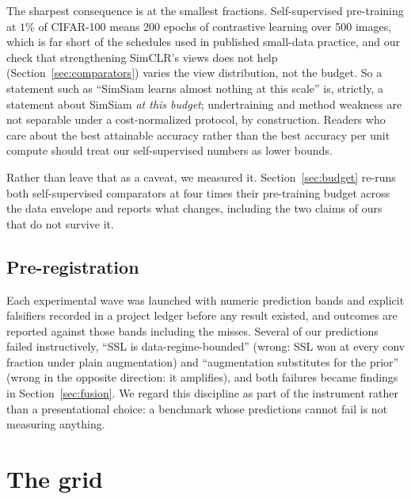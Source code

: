 The sharpest consequence is at the smallest fractions. Self-supervised
pre-training at $1\%$ of CIFAR-100 means 200 epochs of contrastive learning
over 500 images, which is far short of the schedules used in published
small-data practice, and our check that strengthening SimCLR's views does
not help (Section~\ref{sec:comparators}) varies the view distribution, not
the budget. So a statement such as ``SimSiam learns almost nothing at this
scale'' is, strictly, a statement about SimSiam \emph{at this budget};
undertraining and method weakness are not separable under a cost-normalized
protocol, by construction. Readers who care about the best attainable
accuracy rather than the best accuracy per unit compute should treat our
self-supervised numbers as lower bounds.

Rather than leave that as a caveat, we measured it.
Section~\ref{sec:budget} re-runs both self-supervised comparators at four
times their pre-training budget across the data envelope and reports what
changes, including the two claims of ours that do not survive it.

\subsection{Pre-registration}\label{sec:prereg}
Each experimental wave was launched with numeric prediction bands and
explicit falsifiers recorded in a project ledger before any result
existed, and outcomes are reported against those bands including the
misses. Several of our predictions failed instructively, ``SSL is
data-regime-bounded'' (wrong: SSL won at every conv fraction under plain
augmentation) and ``augmentation substitutes for the prior'' (wrong in
the opposite direction: it amplifies), and both failures became
findings in Section~\ref{sec:fusion}. We regard this discipline as part
of the instrument rather than a presentational choice: a benchmark whose
predictions cannot fail is not measuring anything.

\section{The grid}\label{sec:grid}

